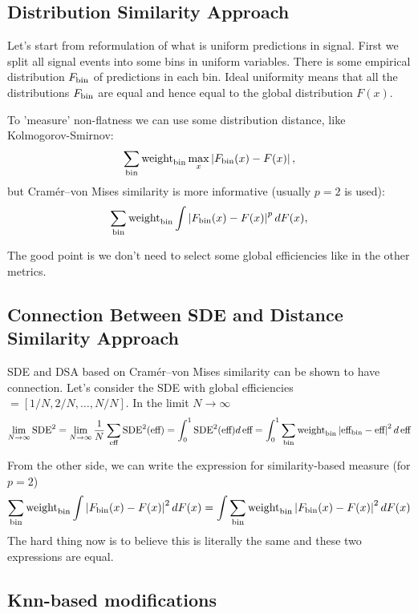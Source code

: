\subsection{Distribution Similarity Approach}
\label{sec:similarity}

Let's start from reformulation of what is uniform predictions in signal. First we split all signal events into some bins in uniform variables. There is some empirical distribution $F_{\text{bin}}$ of predictions in each bin. Ideal uniformity means that all the distributions $F_{\text{bin}}$ are equal and hence equal to the global distribution $F(x)$. 

To 'measure' non-flatness we can use some distribution distance, like Kolmogorov-Smirnov:
\[
	 \sum_{\text{bin}} \text{weight}_\text{bin} \max_x \left\vert F_{\text{bin}}(x) - F(x)\right\vert,
\]
but Cram\'er--von Mises similarity is more informative (usually $p=2$ is used):
\[
	 \sum_{\text{bin}} \text{weight}_\text{bin} \int \left\vert F_{\text{bin}}(x) - F(x)\right\vert^p dF(x),
\]

The good point is we don't need to select some global efficiencies like in the other metrics.


\subsection{Connection Between SDE and Distance Similarity Approach}

SDE and DSA based on Cram\'er--von Mises similarity can be shown to have connection.
Let's consider the SDE with global efficiencies $= [1/N, 2/N, \dots, N/N]$. In the limit $N \to \infty$
\[
	\lim_{N \to \infty} \text{SDE}^2 = 
	\lim_{N \to \infty} \frac{1}{N} \sum_{\text{eff}}\text{SDE}^2(\text{eff}) = 
	\int_0^1 \text{SDE}^2(\text{eff}) d\, \text{eff} = 
	\int_0^1 \sum_{\text{bin}} \text{weight}_\text{bin} \left\vert\text{eff}_\text{bin} - \text{eff}\right\vert^2 d\, \text{eff}
\]

From the other side, we can write the expression for similarity-based measure (for $p=2$) 
\[
	\sum_{\text{bin}} \text{weight}_\text{bin} \int \left\vert F_\text{bin}(x) - F(x)\right\vert^2 dF(x) =
	\int \sum_{\text{bin}} \text{weight}_\text{bin} \left\vert F_\text{bin}(x) - F(x)\right\vert^2 dF(x) 
\] The hard thing now is to believe this is literally the same and these two expressions are equal.


\subsection{Knn-based modifications}

\def\knni{\text{knn}(i)}
\def\effknni{\text{eff}_{\knni}}
\def\weightknni{\text{weight}_{\knni}}
\def\Fknn{F_{\knni}}


